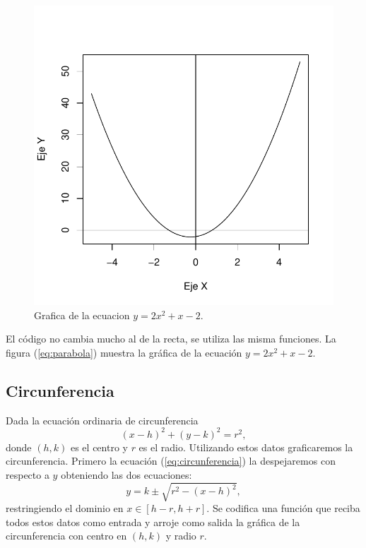 \documentclass[12pt,a4paper]{article} %
\begin{document}
\begin{figure}
\centering
\includegraphics[scale=0.8]{parabola1}
\caption{Grafica de la ecuacion $y = 2x^2 + x - 2$.}
\label{fig:parabola}
\end{figure}

El código no cambia mucho al de la recta, se utiliza las misma funciones. La figura (\ref{eq:parabola}) muestra la gráfica de la ecuación $y = 2x^2 + x - 2$.

\newpage
\subsection{Circunferencia} \label{subsec:circunferencia}

Dada la ecuación ordinaria de circunferencia
\begin{equation}
(x - h)^2 + (y - k)^2 = r^2, \label{eq:circunferencia}
\end{equation}
donde $(h, k)$ es el centro y $r$ es el radio. Utilizando estos datos graficaremos la circunferencia. Primero la ecuación (\ref{eq:circunferencia}) la despejaremos con respecto a $y$ obteniendo las dos ecuaciones:
\begin{equation}
y = k \pm \sqrt{r^2 - (x - h)^2}, \label{eq:circdespejada}
\end{equation}
restringiendo el dominio en $x \in [h - r, h + r]$. Se codifica una función que reciba todos estos datos como entrada y arroje como salida la gráfica de la circunferencia con centro en $(h, k)$ y radio $r$.
\end{document}
